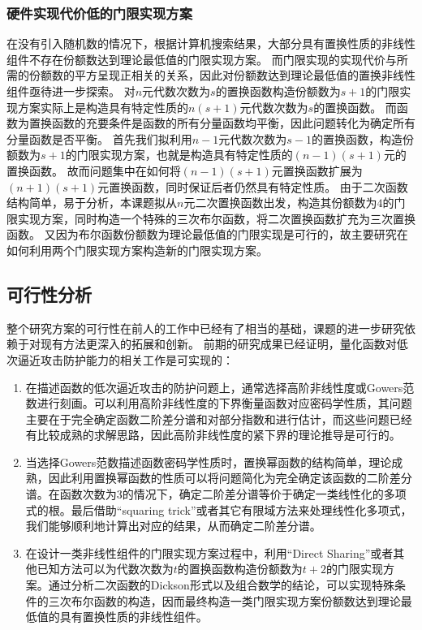 \documentclass[a4paper,zihao=-4,AutoFakeBold]{ctexart}
\begin{document}
\subsubsection{硬件实现代价低的门限实现方案}
在没有引入随机数的情况下，根据计算机搜索结果，大部分具有置换性质的非线性组件不存在份额数达到理论最低值的门限实现方案。
而门限实现的实现代价与所需的份额数的平方呈现正相关的关系，因此对份额数达到理论最低值的置换非线性组件亟待进一步探索。
对$n$元代数次数为$s$的置换函数构造份额数为$s+1$的门限实现方案实际上是构造具有特定性质的$n(s+1)$元代数次数为$s$的置换函数。
而函数为置换函数的充要条件是函数的所有分量函数均平衡，因此问题转化为确定所有分量函数是否平衡。
首先我们拟利用$n-1$元代数次数为$s-1$的置换函数，构造份额数为$s+1$的门限实现方案，也就是构造具有特定性质的$(n-1)(s+1)$元的置换函数。
故而问题集中在如何将$(n-1)(s+1)$元置换函数扩展为$(n+1)(s+1)$元置换函数，同时保证后者仍然具有特定性质。
由于二次函数结构简单，易于分析，本课题拟从$n$元二次置换函数出发，构造其份额数为$4$的门限实现方案，同时构造一个特殊的三次布尔函数，将二次置换函数扩充为三次置换函数。
又因为布尔函数份额数为理论最低值的门限实现是可行的，故主要研究在如何利用两个门限实现方案构造新的门限实现方案。

\subsection{可行性分析}
整个研究方案的可行性在前人的工作中已经有了相当的基础，课题的进一步研究依赖于对现有方法更深入的拓展和创新。
前期的研究成果已经证明，量化函数对低次逼近攻击防护能力的相关工作是可实现的：
\begin{enumerate}[label=\arabic{*})]
    \item 在描述函数的低次逼近攻击的防护问题上，通常选择高阶非线性度或Gowers范数进行刻画。可以利用高阶非线性度的下界衡量函数对应密码学性质，其问题主要在于完全确定函数二阶差分谱和对部分指数和进行估计，而这些问题已经有比较成熟的求解思路，因此高阶非线性度的紧下界的理论推导是可行的。
    \item 当选择Gowers范数描述函数密码学性质时，置换幂函数的结构简单，理论成熟，因此利用置换幂函数的性质可以将问题简化为完全确定该函数的二阶差分谱。在函数次数为3的情况下，确定二阶差分谱等价于确定一类线性化的多项式的根。最后借助``squaring trick''或者其它有限域方法来处理线性化多项式，我们能够顺利地计算出对应的结果，从而确定二阶差分谱。
    \item 在设计一类非线性组件的门限实现方案过程中，利用``Direct Sharing''或者其他已知方法可以为代数次数为$t$的置换函数构造份额数为$t+2$的门限实现方案。通过分析二次函数的Dickson形式以及组合数学的结论，可以实现特殊条件的三次布尔函数的构造，因而最终构造一类门限实现方案份额数达到理论最低值的具有置换性质的非线性组件。
\end{enumerate}
\end{document}
